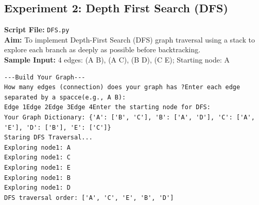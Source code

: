 \subsection*{Experiment 2: Depth First Search (DFS)}
\textbf{Script File:} \texttt{DFS.py} \\[4pt]
\textbf{Aim:} To implement Depth-First Search (DFS) graph traversal using a stack to explore each branch as deeply as possible before backtracking. \\[4pt]
\textbf{Sample Input:} 4 edges: (A B), (A C), (B D), (C E); Starting node: A \\[6pt]
\begin{tcolorbox}[colback=black!5!white,colframe=black!75!white,title=Terminal Execution Output - Depth First Search (DFS)]
\begin{verbatim}
---Build Your Graph---
How many edges (connection) does your graph has ?Enter each edge separated by a spacce(e.g., A B):
Edge 1Edge 2Edge 3Edge 4Enter the starting node for DFS: 
Your Graph Dictionary: {'A': ['B', 'C'], 'B': ['A', 'D'], 'C': ['A', 'E'], 'D': ['B'], 'E': ['C']}
Staring DFS Traversal...
Exploring node1: A
Exploring node1: C
Exploring node1: E
Exploring node1: B
Exploring node1: D
DFS traversal order: ['A', 'C', 'E', 'B', 'D']
\end{verbatim}
\end{tcolorbox}

